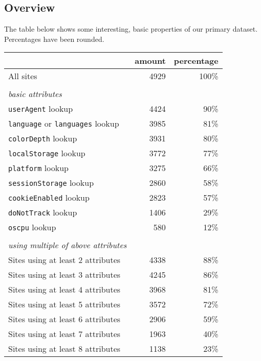 \documentclass[
    fontsize=12pt,
    headings=small,
    parskip=half,
    bibliography=totoc,
    numbers=noenddot,
    open=any
]{scrreprt}
\begin{document}
\subsection{Overview}
The table below shows some interesting, basic properties of our primary dataset. Percentages have been rounded.

\begin{center}
\begin{tabular}{l r r}
\arrayrulecolor{hlinegray}
    & amount & percentage \\
    \hline
    All sites & 4929 & 100\% \\
    \hline
    \\
    \textit{basic attributes} & & \\
    \hline
    \texttt{userAgent} lookup & 4424 & 90\% \\ %
    \hline
    \texttt{language} or \texttt{languages} lookup & 3985 & 81\% \\ %
    \hline
    \texttt{colorDepth} lookup & 3931 & 80\% \\ %
    \hline
    \texttt{localStorage} lookup & 3772 & 77\% \\
    \hline
    \texttt{platform} lookup & 3275 & 66\% \\ %
    \hline
    \texttt{sessionStorage} lookup & 2860 & 58\% \\
    \hline
    \texttt{cookieEnabled} lookup & 2823 & 57\% \\ %
    \hline
    \texttt{doNotTrack} lookup & 1406 & 29\% \\ %
    \hline
    \texttt{oscpu} lookup & 580 & 12\% \\ %
    \hline
    \\
    \textit{using multiple of above attributes} & & \\
    \hline
    Sites using at least 2 attributes & 4338 & 88\% \\
    \hline
    Sites using at least 3 attributes & 4245 & 86\% \\
    \hline
    Sites using at least 4 attributes & 3968 & 81\% \\
    \hline
    Sites using at least 5 attributes & 3572 & 72\% \\
    \hline
    Sites using at least 6 attributes & 2906 & 59\% \\
    \hline
    Sites using at least 7 attributes & 1963 & 40\% \\
    \hline
    Sites using at least 8 attributes & 1138 & 23\% \\

\end{tabular}
\end{center}
\end{document}
